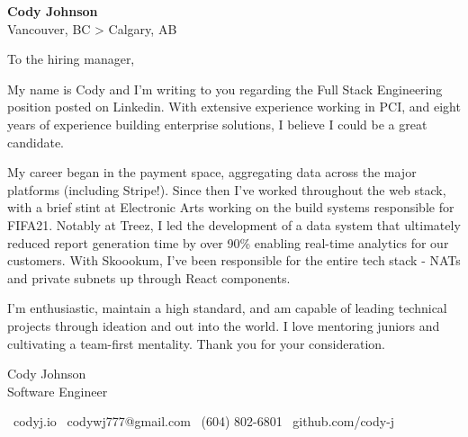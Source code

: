 \documentclass[11pt,a4paper]{article}
\begin{document}
\begin{center}
    {\huge \textbf{Cody Johnson}}\\[0.5em]
    \small{Vancouver, BC > Calgary, AB} 
\end{center}%
\vspace{1em}
\vspace{5em}


\begin{adjustwidth}{}{}

    To the hiring manager,
    \vspace{2em}
    
    My name is Cody and I'm writing to you regarding the Full Stack Engineering position posted on Linkedin. With extensive experience working in PCI, and eight years of experience building enterprise solutions, I believe I could be a great candidate.
    \vspace{1em}

    My career began in the payment space, aggregating data across the major platforms (including Stripe!). Since then I've worked throughout the web stack, with a brief stint at Electronic Arts working on the build systems responsible for FIFA21. Notably at Treez, I led the development of a data system that ultimately reduced report generation time by over 90\% enabling real-time analytics for our customers. With Skoookum, I've been responsible for the entire tech stack - NATs and private subnets up through React components.
    \vspace{1em}

    I'm enthusiastic, maintain a high standard, and am capable of leading technical projects through ideation and out into the world. I love mentoring juniors and cultivating a team-first mentality. Thank you for your consideration.

\end{adjustwidth}

\vspace{4em}

Cody Johnson\\
\vspace{0.3em}
\scriptsize{Software Engineer}


\vfill

\begin{center}
    \faGlobe\ codyj.io%
    \hspace{1em}\textbar\hspace{1em}%
    \faEnvelope\ codywj777@gmail.com%
    \hspace{1em}\textbar\hspace{1em}%
    \faPhone\ (604) 802-6801%
    \hspace{1em}\textbar\hspace{1em}%
    \faGithub\ github.com/cody-j%
\end{center}
\end{document}
